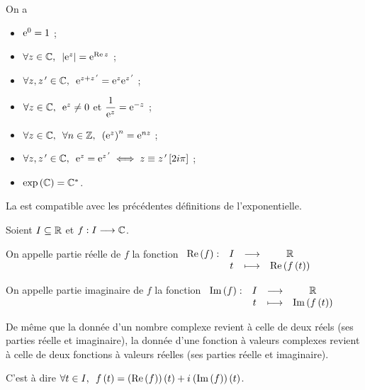 \begin{prop}
On a \begin{itemize}
\item \(\mathrm{e}^{0}=1\) ;

\item \(\quantifs{\forall z\in\C}\abs{\e{z}}=\e{\Re z}\) ;

\item \(\quantifs{\forall z,z\prim\in\C}\e{z+z\prim}=\e{z}\e{z\prim}\) ;

\item \(\quantifs{\forall z\in\C}\e{z}\not=0\) et \(\dfrac{1}{\mathrm{e}^{z}}=\mathrm{e}^{-z}\) ;

\item \(\quantifs{\forall z\in\C;\forall n\in\Z}\paren{\e{z}}^n=\e{nz}\) ;

\item \(\quantifs{\forall z,z\prim\in\C}\e{z}=\e{z\prim}\ssi z\equiv z\prim\croch{2i\pi}\) ;

\item \(\exp\left(\mathbb{C}\right)=\mathbb{C}^*\).
\end{itemize}
\end{prop}

\begin{dem}
\end{dem}

\begin{rem}
La  est compatible avec les précédentes définitions de l'exponentielle.
\end{rem}

\begin{defi}
Soient \(I\subseteq\mathbb{R}\) et \(f:I\longrightarrow\mathbb{C}\).

On appelle partie réelle de \(f\) la fonction \(\begin{array}[t]{cccc}\operatorname{Re}\left(f\right) : & I & \longrightarrow & \mathbb{R} \\ & t & \longmapsto & \operatorname{Re}\left(f\left(t\right)\right)\end{array}\)

On appelle partie imaginaire de \(f\) la fonction \(\begin{array}[t]{cccc}\operatorname{Im}\left(f\right) : & I & \longrightarrow & \mathbb{R} \\ & t & \longmapsto & \operatorname{Im}\left(f\left(t\right)\right)\end{array}\)
\end{defi}

\begin{rem}
De même que la donnée d'un nombre complexe revient à celle de deux réels (ses parties réelle et imaginaire), la donnée d'une fonction à valeurs complexes revient à celle de deux fonctions à valeurs réelles (ses parties réelle et imaginaire).

C'est à dire \(\quantifs{\forall t\in I}f\paren{t}=\paren{\Re\paren{f}}\paren{t}+\i\paren{\Im\paren{f}}\paren{t}\).
\end{rem}

